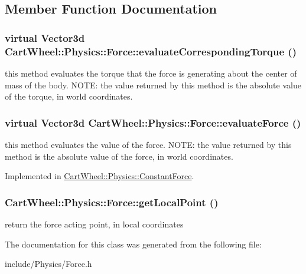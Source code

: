 \subsection{Member Function Documentation}
\hypertarget{classCartWheel_1_1Physics_1_1Force_a269d938ebca563f217e32889e79b555c}{
\subsubsection[{evaluateCorrespondingTorque}]{\setlength{\rightskip}{0pt plus 5cm}virtual {\bf Vector3d} CartWheel::Physics::Force::evaluateCorrespondingTorque ()}}
\label{classCartWheel_1_1Physics_1_1Force_a269d938ebca563f217e32889e79b555c}
this method evaluates the torque that the force is generating about the center of mass of the body. NOTE: the value returned by this method is the absolute value of the torque, in world coordinates. \hypertarget{classCartWheel_1_1Physics_1_1Force_a40ed851fc5773dfd6e00a6facf7cf719}{
\subsubsection[{evaluateForce}]{\setlength{\rightskip}{0pt plus 5cm}virtual {\bf Vector3d} CartWheel::Physics::Force::evaluateForce ()}}
\label{classCartWheel_1_1Physics_1_1Force_a40ed851fc5773dfd6e00a6facf7cf719}
this method evaluates the value of the force. NOTE: the value returned by this method is the absolute value of the force, in world coordinates. 

Implemented in \hyperlink{classCartWheel_1_1Physics_1_1ConstantForce_a93106709ed5d357d1cfd18cca1921bad}{CartWheel::Physics::ConstantForce}.

\hypertarget{classCartWheel_1_1Physics_1_1Force_aecb0b1317e793fd12ac76e6fa92474a8}{
\subsubsection[{getLocalPoint}]{ CartWheel::Physics::Force::getLocalPoint ()}}
\label{classCartWheel_1_1Physics_1_1Force_aecb0b1317e793fd12ac76e6fa92474a8}
return the force acting point, in local coordinates 

The documentation for this class was generated from the following file:\begin{DoxyCompactItemize}
\item 
include/Physics/Force.h\end{DoxyCompactItemize}
